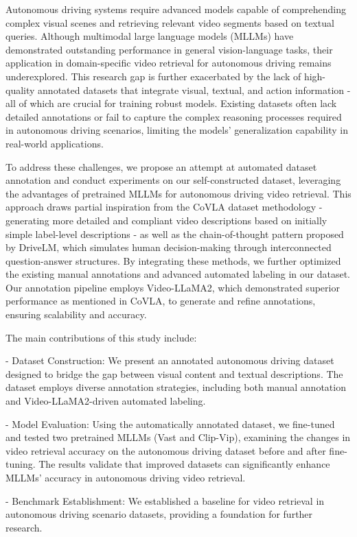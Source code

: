 \documentclass[lettersize,journal]{IEEEtran}
\begin{document}
Autonomous driving systems require advanced models capable of comprehending complex visual scenes and retrieving relevant video segments based on textual queries. Although multimodal large language models (MLLMs) have demonstrated outstanding performance in general vision-language tasks, their application in domain-specific video retrieval for autonomous driving remains underexplored. This research gap is further exacerbated by the lack of high-quality annotated datasets that integrate visual, textual, and action information - all of which are crucial for training robust models. Existing datasets often lack detailed annotations or fail to capture the complex reasoning processes required in autonomous driving scenarios, limiting the models' generalization capability in real-world applications.

To address these challenges, we propose an attempt at automated dataset annotation and conduct experiments on our self-constructed dataset, leveraging the advantages of pretrained MLLMs for autonomous driving video retrieval. This approach draws partial inspiration from the CoVLA dataset methodology - generating more detailed and compliant video descriptions based on initially simple label-level descriptions - as well as the chain-of-thought pattern proposed by DriveLM, which simulates human decision-making through interconnected question-answer structures. By integrating these methods, we further optimized the existing manual annotations and advanced automated labeling in our dataset. Our annotation pipeline employs Video-LLaMA2, which demonstrated superior performance as mentioned in CoVLA, to generate and refine annotations, ensuring scalability and accuracy.

The main contributions of this study include:

- Dataset Construction: We present an annotated autonomous driving dataset designed to bridge the gap between visual content and textual descriptions. The dataset employs diverse annotation strategies, including both manual annotation and Video-LLaMA2-driven automated labeling.

- Model Evaluation: Using the automatically annotated dataset, we fine-tuned and tested two pretrained MLLMs (Vast and Clip-Vip), examining the changes in video retrieval accuracy on the autonomous driving dataset before and after fine-tuning. The results validate that improved datasets can significantly enhance MLLMs' accuracy in autonomous driving video retrieval.

- Benchmark Establishment: We established a baseline for video retrieval in autonomous driving scenario datasets, providing a foundation for further research.
\end{document}
